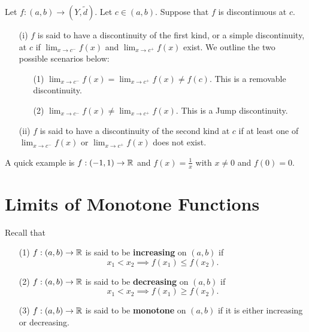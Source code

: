 \documentclass[a4paper]{article}
\begin{document}
\begin{definition}
    Let \( f: (a,b) \to (Y, \tilde{d}) \). Let \( c \in (a,b) \). Suppose that \( f  \) is discontinuous at \( c  \).
    \begin{enumerate}
        \item[(i)] \( f  \) is said to have a discontinuity of the first kind, or a simple discontinuity, at \( c  \) if \( \lim_{ x \to c^{-} } f(x) \) and \( \lim_{ x \to c^{+} } f(x) \) exist. We outline the two possible scenarios below:
            \begin{enumerate}
                \item[(1)] \( \lim_{ x \to c^{-} } f(x) = \lim_{ x \to c^{+} } f(x) \neq f(c) \). This is a removable discontinuity.
                \item[(2)] \( \lim_{ x \to c^{-} } f(x) \neq \lim_{ x \to c^{+} } f(x)  \). This is a Jump discontinuity.
            \end{enumerate}
        \item[(ii)] \( f  \) is said to have a discontinuity of the second kind at \( c  \) if at least one of \( \lim_{ x \to c^{-} } f(x) \) or \( \lim_{ x \to c^{+} } f(x) \) does not exist. 
    \end{enumerate}
\end{definition}

A quick example is \( f: (-1,1) \to \mathbb{R}  \) and \( f(x) = \frac{ 1 }{ x }  \) with \( x \neq 0 \) and \( f(0) = 0 \).


\section{Limits of Monotone Functions}\label{Limits of Monotone Functions}


Recall that  
\begin{enumerate}
    \item[(1)] \( f: (a,b) \to \mathbb{R}  \) is said to be \textbf{increasing} on \( (a,b) \) if 
        \[  {x}_{1} < {x}_{2} \implies f({x}_{1}) \leq f({x}_{2}). \]
    \item[(2)] \( f: (a,b) \to \mathbb{R}  \) is said to be \textbf{decreasing} on \( (a,b) \) if  
        \[  {x}_{1} < {x}_{2} \implies f({x}_{1}) \geq  f({x}_{2}). \]
    \item[(3)] \( f: (a,b) \to \mathbb{R}  \) is said to be \textbf{monotone} on \( (a,b) \) if it is either increasing or decreasing.
\end{enumerate}
\end{document}
